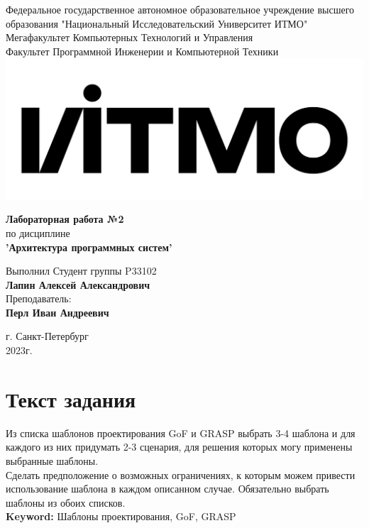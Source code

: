 \documentclass[12pt,onecolumn]{article}
\begin{document}
\setcounter{tocdepth}{4}
\begin{center}
    Федеральное государственное автономное образовательное учреждение высшего образования "Национальный Исследовательский Университет ИТМО"\\ 
    Мегафакультет Компьютерных Технологий и Управления\\
    Факультет Программной Инженерии и Компьютерной Техники \\
    \includegraphics[scale=0.3]{image/itmo.jpg} %
\end{center}
\vspace{1cm}


\begin{center}
    \textbf{Лабораторная работа №2}\\
    по дисциплине\\
    \textbf{'Архитектура программных систем'}\\
\end{center}

\vspace{2cm}

\begin{flushright}
  Выполнил Студент  группы P33102\\
  \textbf{Лапин Алексей Александрович}\\
  Преподаватель: \\
  \textbf{Перл Иван Андреевич}\\
\end{flushright}

\vspace{10cm}
\begin{center}
    г. Санкт-Петербург\\
    2023г.
\end{center}
\thispagestyle{empty}
\newpage
\tableofcontents
\newpage
\section{Текст задания}
Из списка шаблонов проектирования GoF и GRASP выбрать 3-4 шаблона и для каждого из них придумать 2-3 сценария, для решения которых могу применены выбранные шаблоны.\\
Сделать предположение о возможных ограничениях, к которым можем привести использование шаблона в каждом описанном случае. Обязательно выбрать шаблоны из обоих списков.\\
\textbf{Keyword:} Шаблоны проектирования, GoF, GRASP
\end{document}
